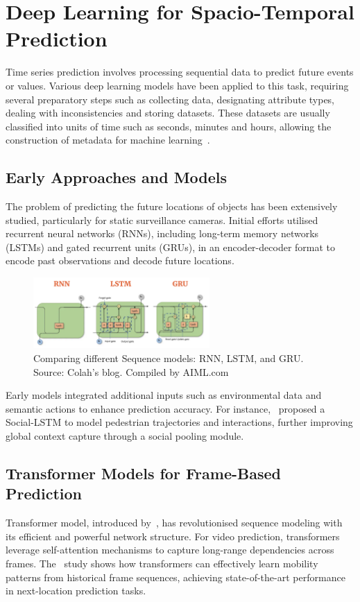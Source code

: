 \documentclass[12pt,oneside]{book} %
\begin{document}
\newpage
\section{Deep Learning for Spacio-Temporal Prediction}
Time series prediction involves processing sequential data to predict future
events or values. Various deep learning models have been applied to this task,
requiring several preparatory steps such as collecting data, designating
attribute types, dealing with inconsistencies and storing datasets. These
datasets are usually classified into units of time such as seconds, minutes and
hours, allowing the construction of metadata for machine
learning~\cite{FFPSpaceSystemVehicles}.

\subsection*{Early Approaches and Models}
The problem of predicting the future locations of objects has been extensively
studied, particularly for static surveillance cameras. Initial efforts utilised
recurrent neural networks (RNNs), including long-term memory networks (LSTMs)
and gated recurrent units (GRUs), in an encoder-decoder format to encode past
observations and decode future locations. 

\begin{figure}[H]
    \centering
    \includegraphics[width=0.6\textwidth]{figures/lstm-rnn-gru.png}
    \caption{Comparing different Sequence models: RNN, LSTM, and GRU. Source: Colah's blog. Compiled by AIML.com}\label{fig:lstm-rnn-gru}
\end{figure}

Early models integrated additional inputs such as environmental data and
semantic actions to enhance prediction accuracy. For
instance,~\citet{Alahi2016} proposed a Social-LSTM to model pedestrian
trajectories and interactions, further improving global context capture through
a social pooling module.

\subsection*{Transformer Models for Frame-Based Prediction}
Transformer model, introduced by~\citet{Vaswani2017}, has revolutionised
sequence modeling with its efficient and powerful network structure. For video
prediction, transformers leverage self-attention mechanisms to capture
long-range dependencies across frames. The~\citet{HowDoUGoWhere} study shows
how transformers can effectively learn mobility patterns from historical frame
sequences, achieving state-of-the-art performance in next-location prediction
tasks.
\end{document}
